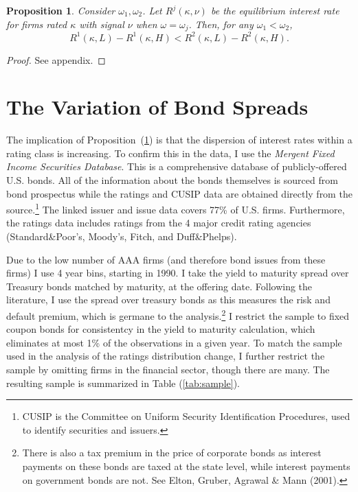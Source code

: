 \documentclass[notitlepage]{article}
\newtheorem{proposition}{Proposition}
\begin{document}
\begin{proposition}
\label{pr:sprd}%
Consider $\omega_{1},\omega_{2}$. Let $R^{j}(\kappa,\nu)$ be the equilibrium interest rate for firms rated $\kappa$ with signal $\nu$ when $\omega=\omega_{j}$. Then, for any $\omega_{1}<\omega_{2}$,
\begin{equation*}
R^{1}(\kappa,L)-R^{1}(\kappa,H)<R^{2}(\kappa,L)-R^{2}(\kappa,H).
\end{equation*}
\end{proposition}

\begin{proof}
See appendix.
\end{proof}

\section{The Variation of Bond Spreads}
\label{sec:cov}
The implication of Proposition~(\ref{pr:sprd}) is that the dispersion of interest rates within a rating class is increasing. To confirm this in the data, I use the \textit{Mergent Fixed Income Securities Database}. This is a comprehensive database of publicly-offered U.S. bonds. All of the information about the bonds themselves is sourced from bond prospectus while the ratings and CUSIP data are obtained directly from the source.\footnote{CUSIP is the Committee on Uniform Security Identification Procedures, used to identify securities and issuers.} The linked issuer and issue data covers 77\% of U.S. firms. Furthermore, the ratings data includes ratings from the 4 major credit rating agencies (Standard\&Poor's, Moody's, Fitch, and Duff\&Phelps). 

Due to the low number of AAA firms (and therefore bond issues from these firms) I use 4 year bins, starting in 1990. I take the yield to maturity spread over Treasury bonds matched by maturity, at the offering date. Following the literature, I use the spread over treasury bonds as this measures the risk and default premium, which is germane to the analysis.\footnote{There is also a tax premium in the price of corporate bonds as interest payments on these bonds are taxed at the state level, while interest payments on government bonds are not. See Elton, Gruber, Agrawal \& Mann (2001).}  I restrict the sample to fixed coupon bonds for consistentcy in the yield to maturity calculation, which eliminates at most 1\% of the observations in a given year. To match the sample used in the analysis of the ratings distribution change, I further restrict the sample by omitting firms in the financial sector, though there are many. The resulting sample is summarized in Table (\ref{tab:sample}). 
\end{document}
